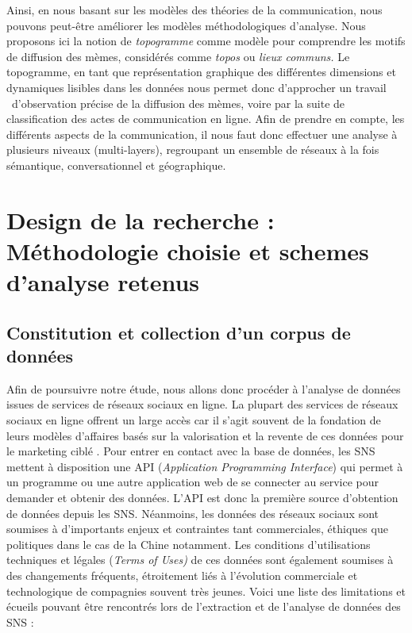 Ainsi, en nous basant sur les mod\`eles des th\'eories de la
communication, nous pouvons peut-\^etre am\'eliorer les mod\`eles
m\'ethodologiques d{\textquoteright}analyse. Nous proposons ici la
notion de \textit{topogramme }comme mod\`ele pour comprendre les motifs
de diffusion des m\`emes, consid\'er\'es comme \textit{topos} ou
\textit{lieux communs. }Le topogramme, en tant que repr\'esentation
graphique des diff\'erentes dimensions et dynamiques lisibles dans les
donn\'ees nous permet donc d{\textquoteright}approcher un travail
\ d{\textquoteright}observation pr\'ecise de la diffusion des m\`emes,
voire par la suite de classification des actes de communication en
ligne. Afin de prendre en compte, les diff\'erents aspects de la
communication, il nous faut donc effectuer une analyse \`a plusieurs
niveaux (multi-layers), regroupant un ensemble de r\'eseaux \`a la fois
s\'emantique, conversationnel et g\'eographique. 



\section{Design de la recherche : M\'ethodologie choisie et schemes d{\textquoteright}analyse retenus}

\subsection[Constitution et collection d{\textquoteright}un corpus de donn\'ees]{Constitution et collection d{\textquoteright}un corpus de donn\'ees}
Afin de poursuivre notre \'etude, nous allons donc proc\'eder \`a
l{\textquoteright}analyse de donn\'ees issues de services de r\'eseaux
sociaux en ligne. La plupart des services de r\'eseaux sociaux en ligne
offrent un large acc\`es car il s{\textquoteright}agit souvent de la
fondation de leurs mod\`eles d{\textquoteright}affaires bas\'es sur la
valorisation et la revente de ces donn\'ees pour le marketing cibl\'e
\citep{Ko2010}. Pour entrer en contact avec la base de donn\'ees, les SNS
mettent \`a disposition une API (\textit{Application Programming
Interface}) qui permet \`a un programme ou une autre application web de
se connecter au service pour demander et obtenir des donn\'ees.
L{\textquoteright}API est donc la premi\`ere source
d{\textquoteright}obtention de donn\'ees depuis les SNS. N\'eanmoins,
les donn\'ees des r\'eseaux sociaux sont soumises \`a
d{\textquoteright}importants enjeux et contraintes tant commerciales,
\'ethiques que politiques dans le cas de la Chine notamment. Les
conditions d{\textquoteright}utilisations techniques et l\'egales
(\textit{Terms of Uses) }de ces donn\'ees sont \'egalement soumises \`a
des changements fr\'equents, \'etroitement li\'es \`a
l{\textquoteright}\'evolution commerciale et technologique de
compagnies souvent tr\`es jeunes. Voici une liste des limitations et
\'ecueils pouvant \^etre rencontr\'es lors de
l{\textquoteright}extraction et de l{\textquoteright}analyse de
donn\'ees des SNS :


